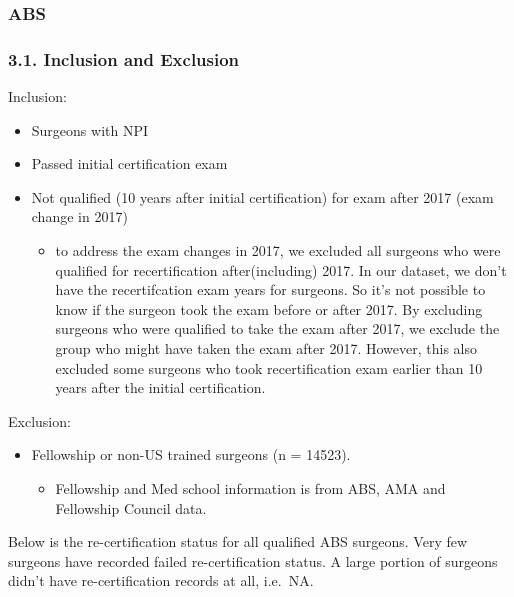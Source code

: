 \documentclass[
]{article}
\providecommand{\tightlist}{%
  \setlength{\itemsep}{0pt}\setlength{\parskip}{0pt}}
\begin{document}
\hypertarget{abs}{%
\subsubsection{ABS}\label{abs}}

\hypertarget{inclusion-and-exclusion}{%
\subsubsection{3.1. Inclusion and
Exclusion}\label{inclusion-and-exclusion}}

Inclusion:

\begin{itemize}
\tightlist
\item
  Surgeons with NPI
\item
  Passed initial certification exam
\item
  Not qualified (10 years after initial certification) for exam after
  2017 (exam change in 2017)

  \begin{itemize}
  \tightlist
  \item
    to address the exam changes in 2017, we excluded all surgeons who
    were qualified for recertification after(including) 2017. In our
    dataset, we don't have the recertifcation exam years for surgeons.
    So it's not possible to know if the surgeon took the exam before or
    after 2017. By excluding surgeons who were qualified to take the
    exam after 2017, we exclude the group who might have taken the exam
    after 2017. However, this also excluded some surgeons who took
    recertification exam earlier than 10 years after the initial
    certification.
  \end{itemize}
\end{itemize}

Exclusion:

\begin{itemize}
\tightlist
\item
  Fellowship or non-US trained surgeons (n = 14523).

  \begin{itemize}
  \tightlist
  \item
    Fellowship and Med school information is from ABS, AMA and
    Fellowship Council data.
  \end{itemize}
\end{itemize}

Below is the re-certification status for all qualified ABS surgeons.
Very few surgeons have recorded failed re-certification status. A large
portion of surgeons didn't have re-certification records at all,
i.e.~NA.
\end{document}
